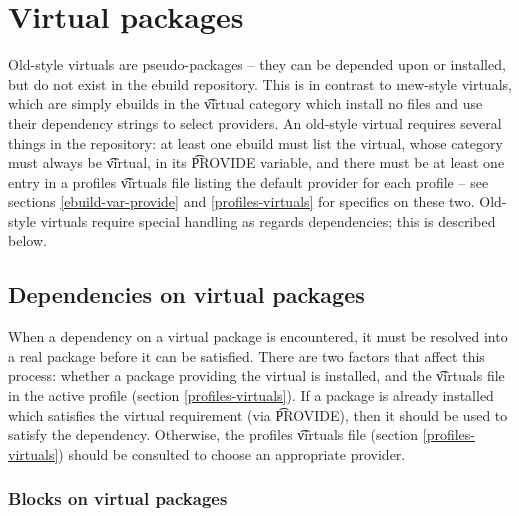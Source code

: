 \chapter{Virtual packages}
\label{old-virtuals}

Old-style virtuals are pseudo-packages -- they can be depended upon or installed, but do not exist
in the ebuild repository. This is in contrast to \i{new-style} virtuals, which are simply ebuilds in
the \t{virtual} category which install no files and use their dependency strings to select
providers. An old-style virtual requires several things in the repository: at least
one ebuild must list the virtual, whose category must always be \t{virtual}, in its \t{PROVIDE}
variable, and there must be at least one entry in a profiles \t{virtuals} file listing the default
provider for each profile -- see sections \ref{ebuild-var-provide} and \ref{profiles-virtuals} for
specifics on these two. Old-style virtuals require special handling as regards dependencies; this is
described below.

\section{Dependencies on virtual packages}

When a dependency on a virtual package is encountered, it must be resolved into a real package
before it can be satisfied. There are two factors that affect this process: whether a package
providing the virtual is installed, and the \t{virtuals} file in the active profile (section
\ref{profiles-virtuals}). If a package is already installed which satisfies the virtual requirement
(via \t{PROVIDE}), then it should be used to satisfy the dependency. Otherwise, the profiles
\t{virtuals} file (section \ref{profiles-virtuals}) should be consulted to choose an appropriate
provider.

\subsection{Blocks on virtual packages}



